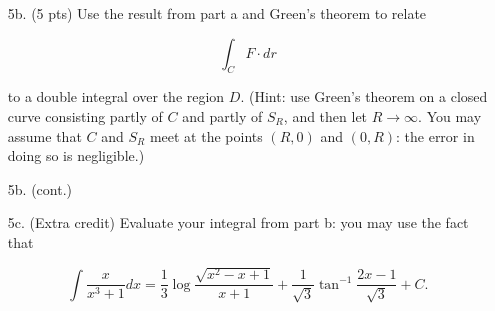 \documentclass[12 pt]{report}
\begin{document}
\begin{enumerate}
\vspace{4cm} 

\item[5b.] (5 pts) Use the result from part a and Green's theorem to relate

$$\int_{C} F \cdot dr$$

to a double integral over the region $D$. (Hint: use Green's theorem on a closed curve consisting partly of $C$ and partly of $S_R$, and then let $R \to \infty$. You may assume that $C$ and $S_R$ meet at the points $(R,0)$ and $(0,R)$: the error in doing so is negligible.)

\newpage 


\item[5b.] (cont.)  

\vspace{8cm}
 
\item[5c.] (Extra credit) Evaluate your integral from part b: you may use the fact that 

$$\int \frac{x}{x^3+1} dx = \frac{1}{3} \log \frac{\sqrt{x^2-x+1}}{x+1} + \frac{1}{\sqrt{3}} \tan^{-1} \frac{2x-1}{\sqrt{3}} + C.$$ 

\end{enumerate}
\end{document}
